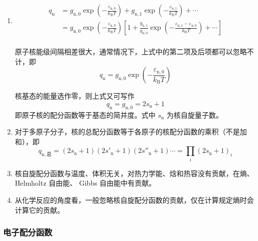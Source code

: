 \begin{enumerate}
    \item 
    \begin{equation*}
        \begin{aligned}
            q_{\mathrm{n}} &= g_{\mathrm{n},0} \exp\left(-\frac{\varepsilon_{\mathrm{n},0}}{k_\mathrm{B} T}\right) +  g_{\mathrm{n},1} \exp\left(-\frac{\varepsilon_{\mathrm{n},1}}{k_\mathrm{B} T}\right) + \cdots\\
            &= g_{\mathrm{n},0} \exp\left(-\frac{\varepsilon_{\mathrm{n},0}}{k_\mathrm{B} T}\right) \left[1 + \frac{g_{\mathrm{n},1}}{g_{\mathrm{n},0}} \exp\left(-\frac{\varepsilon_{\mathrm{n},1} - \varepsilon_{\mathrm{n},0}}{k_\mathrm{B} T}\right) + \cdots\right] \\
        \end{aligned}
    \end{equation*}

    原子核能级间隔相差很大，通常情况下，上式中的第二项及后项都可以忽略不计，即
    \begin{equation}
        q_{\mathrm{n}} = g_{\mathrm{n},0} \exp\left(-\frac{\varepsilon_{\mathrm{n},0}}{k_\mathrm{B} T}\right)
    \end{equation}

    核基态的能量选作零，则上式又可写作
    \begin{equation}
        q_{\mathrm{n}} = g_{\mathrm{n},0} = 2s_{\mathrm{n}} + 1
    \end{equation}
    即原子核的配分函数等于基态的简并度。式中 $s_{\mathrm{n}}$ 为核自旋量子数。

    \item 对于多原子分子，核的总配分函数等于各原子的核配分函数的乘积（不是加和），即
    \begin{equation}
        q_{\mathrm{n},\text{总}} = (2s_{\mathrm{n}} + 1)(2s'_{\mathrm{n}} + 1)(2s''_{\mathrm{n}} + 1) \cdots = \prod_{i} (2s_{\mathrm{n}} + 1)_i
    \end{equation}

    \item 核自旋配分函数与温度、体积无关，对热力学能、焓和热容没有贡献，在熵、Helmholtz 自由能、 Gibbs 自由能中有贡献。
    \item 从化学反应的角度看，一般忽略核自旋配分函数的贡献，仅在计算规定熵时会计算它的贡献。
\end{enumerate}
\subsubsection{电子配分函数}

